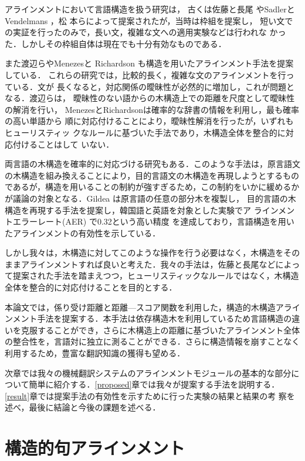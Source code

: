 \documentclass[japanese]{jnlp_1.4}
\begin{document}
アラインメントにおいて言語構造を扱う研究は，
古くは佐藤と長尾 \cite{sato:1990:COLING}やSadlerとVendelmans \cite{sadler:1990:COLING}，松
本ら\cite{matsumoto:1993:ACL}によって提案されたが，当時は枠組を提案し，
短い文での実証を行ったのみで，長い文，複雑な文への適用実験などは行われな
かった．しかしその枠組自体は現在でも十分有効なものである．

また渡辺ら\cite{watanabe:2000:COLING}やMenezesと
Richardson \cite{Menezes01}も構造を用いたアラインメント手法を提案している．
これらの研究では，比較的長く，複雑な文のアラインメントを行っている．文が
長くなると，対応関係の曖昧性が必然的に増加し，これが問題となる．渡辺らは，
曖昧性のない語からの木構造上での距離を尺度として曖昧性の解消を行い，
MenezesとRichardsonは確率的な辞書の情報を利用し，最も確率の高い単語から
順に対応付けることにより，曖昧性解消を行ったが，いずれもヒューリスティッ
クなルールに基づいた手法であり，木構造全体を整合的に対応付けることはして
いない．


両言語の木構造を確率的に対応づける研究もある．このような手法は，原言語文
の木構造を組み換えることにより，目的言語文の木構造を再現しようとするもの
であるが，構造を用いることの制約が強すぎるため，この制約をいかに緩めるか
が議論の対象となる．Gildea \cite{Gildea03}は原言語の任意の部分木を複製し，
目的言語の木構造を再現する手法を提案し，韓国語と英語を対象とした実験でア
ラインメントエラーレート(AER) \cite{och00comparison}で0.32という高い精度
を達成しており，言語構造を用いたアラインメントの有効性を示している．

しかし我々は，木構造に対してこのような操作を行う必要はなく，木構造をその
ままアラインメントすれば良いと考えた．我々の手法は，佐藤と長尾などによっ
て提案された手法を踏まえつつ，ヒューリスティックなルールではなく，木構造
全体を整合的に対応付けることを目的とする．


本論文では，係り受け距離と距離—スコア関数を利用した，構造的木構造アライ
ンメント手法を提案する．本手法は依存構造木を利用しているため言語構造の違
いを克服することができ，さらに木構造上の距離に基づいたアラインメント全体
の整合性を，言語対に独立に測ることができる．さらに構造情報を崩すことなく
利用するため，豊富な翻訳知識の獲得も望める．


次章では我々の機械翻訳システムのアラインメントモジュールの基本的な部分に
ついて簡単に紹介する．\ref{proposed}章では我々が提案する手法を説明する．
\ref{result}章では提案手法の有効性を示すために行った実験の結果と結果の考
察を述べ，最後に結論と今後の課題を述べる．


\section{構造的句アラインメント}
\end{document}

